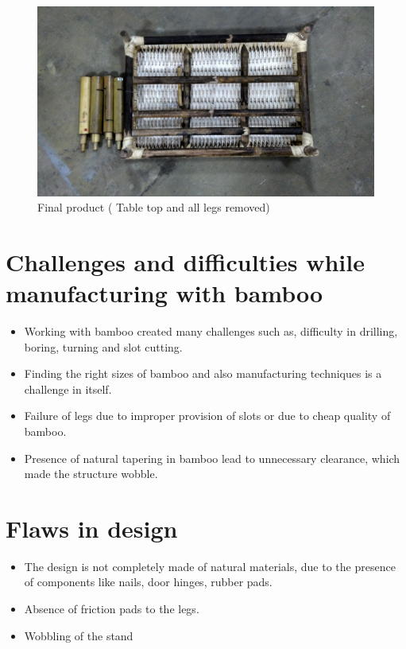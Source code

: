 \begin{figure}[h]
    \centering
    \includegraphics[width=\linewidth]{fi4}
    \caption{Final product ( Table top and all legs removed)}
    \label{fig:mesh4}
\end{figure}


\section{Challenges and difficulties while manufacturing with bamboo}

\begin{itemize}
	\item Working with bamboo created many challenges such as, difficulty in drilling, boring, 		turning and slot cutting. 
	\item Finding the right sizes of bamboo and also manufacturing techniques is a challenge in 	itself. 
	\item Failure of legs due to improper provision of slots or due to cheap quality of bamboo.
	\item Presence of natural tapering in bamboo lead to unnecessary clearance, which made the 	structure wobble.

\end{itemize}

\section{Flaws in design}

\begin{itemize}
\item The design is not completely made of natural materials, due to the presence of components like nails, door hinges, rubber pads. 
\item Absence of friction pads to the legs.
\item Wobbling of the stand

\end{itemize}

